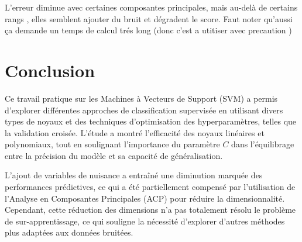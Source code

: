 \documentclass[10pt,a4paper]{article}
\begin{document}
L'erreur diminue avec certaines composantes principales, mais au-delà de certains rangs , elles semblent ajouter du bruit et dégradent le score. 
Faut noter qu'aussi ça demande un temps de calcul trés long (donc c'est a utitiser avec precaution )

\section*{Conclusion}

Ce travail pratique sur les Machines à Vecteurs de Support (SVM) a permis d'explorer différentes approches de classification supervisée en utilisant divers types de noyaux et des techniques d'optimisation des hyperparamètres, telles que la validation croisée. L'étude a montré l'efficacité des noyaux linéaires et polynomiaux, tout en soulignant l'importance du paramètre \( C \) dans l'équilibrage entre la précision du modèle et sa capacité de généralisation.

L'ajout de variables de nuisance a entraîné une diminution marquée des performances prédictives, ce qui a été partiellement compensé par l'utilisation de l'Analyse en Composantes Principales (ACP) pour réduire la dimensionnalité. Cependant, cette réduction des dimensions n'a pas totalement résolu le problème de sur-apprentissage, ce qui souligne la nécessité d'explorer d'autres méthodes plus adaptées aux données bruitées.
\end{document}
